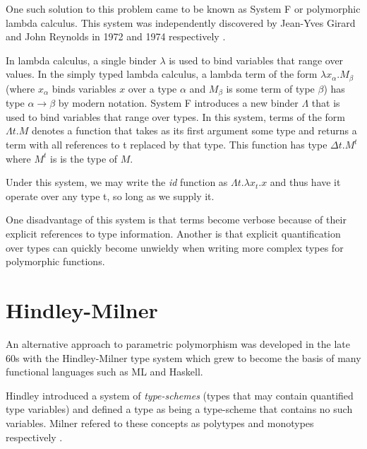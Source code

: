           One such solution to this problem came to be known as System F
          or polymorphic lambda calculus. This system was independently
          discovered by Jean-Yves Girard and John Reynolds in 1972 and 1974
          respectively \cite{Girard1972,reynolds1974}.
      
          In lambda calculus, a single binder $\lambda$ is used to bind variables
          that range over values. In the simply typed lambda calculus, a
          lambda term of the form $\lambda x_{\alpha}.M_{\beta}$ (where
          $x_{\alpha}$ binds variables $x$ over a type $\alpha$ and
          $M_{\beta}$ is some term of type $\beta $) has type
          $\alpha\to\beta$ by modern notation. System F introduces a new
          binder $\Lambda$ that is used to bind variables that range over
          types. In this system, terms of the form $\Lambda t.M$ denotes a
          function that takes as its first argument some type and returns a
          term with all references to t replaced by that type. This function
          has type $\Delta t.M^{t}$ where $M^t$ is is the type of $M$.
      
          Under this system, we may write the \emph{id} function as $\Lambda t
          . \lambda x_t . x$ and thus have it operate over any type t,
          so long as we supply it.
      
          One disadvantage of this system is that terms become verbose
          because of their explicit references to type
          information. Another is that explicit quantification over
          types can quickly become unwieldy when writing more complex
          types for polymorphic functions.

          \section{Hindley-Milner}
            An alternative approach to parametric polymorphism was
            developed in the late 60s with the Hindley-Milner type
            system which grew to become the basis of many functional
            languages such as ML and Haskell.
                        
            Hindley introduced a system of \textit{type-schemes}
            \cite{hindley1969} (types that may contain quantified type
            variables) and defined a type as being a type-scheme that
            contains no such variables. Milner refered to these
            concepts as polytypes and monotypes respectively
            \cite{milner1978}. 
            
